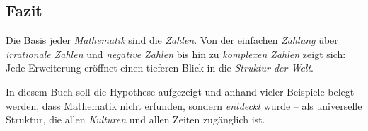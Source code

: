\subsection{Fazit}

Die Basis jeder \emph{Mathematik} sind die 
\emph{Zahlen}. 
Von der einfachen \emph{Zählung} über 
\emph{irrationale Zahlen} 
und \emph{negative Zahlen} 
bis hin zu \emph{komplexen Zahlen} zeigt sich: 
Jede Erweiterung eröffnet einen tieferen Blick in die 
\emph{Struktur der Welt}.  

In diesem Buch soll die Hypothese aufgezeigt 
und anhand vieler Beispiele belegt werden, 
dass Mathematik nicht erfunden, sondern \emph{entdeckt} wurde – 
als universelle Struktur, 
die allen \emph{Kulturen} und allen Zeiten zugänglich ist.  



\vspace{1em}



